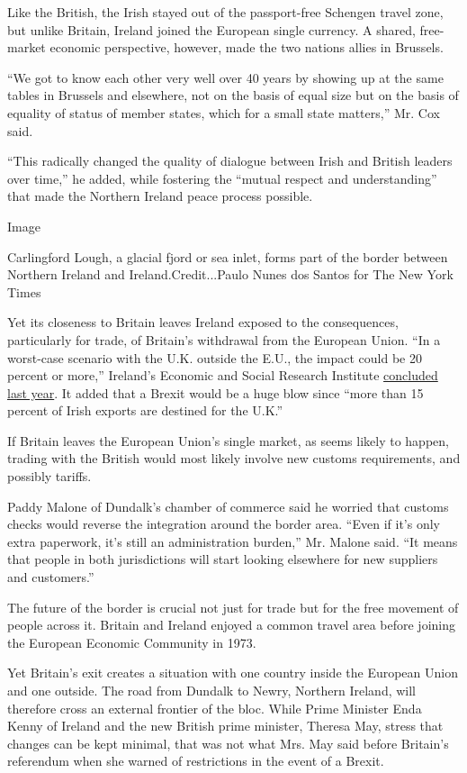 Like the British, the Irish stayed out of the passport-free Schengen
travel zone, but unlike Britain, Ireland joined the European single
currency. A shared, free-market economic perspective, however, made the
two nations allies in Brussels.

``We got to know each other very well over 40 years by showing up at the
same tables in Brussels and elsewhere, not on the basis of equal size
but on the basis of equality of status of member states, which for a
small state matters,'' Mr. Cox said.

``This radically changed the quality of dialogue between Irish and
British leaders over time,'' he added, while fostering the ``mutual
respect and understanding'' that made the Northern Ireland peace process
possible.

Image

Carlingford Lough, a glacial fjord or sea inlet, forms part of the
border between Northern Ireland and Ireland.Credit...Paulo Nunes dos
Santos for The New York Times

Yet its closeness to Britain leaves Ireland exposed to the consequences,
particularly for trade, of Britain's withdrawal from the European Union.
``In a worst-case scenario with the U.K. outside the E.U., the impact
could be 20 percent or more,'' Ireland's Economic and Social Research
Institute
\href{https://www.esri.ie/publications/scoping-the-possible-economic-implications-of-brexit-on-ireland-2/}{concluded
last year}. It added that a Brexit would be a huge blow since ``more
than 15 percent of Irish exports are destined for the U.K.''

If Britain leaves the European Union's single market, as seems likely to
happen, trading with the British would most likely involve new customs
requirements, and possibly tariffs.

Paddy Malone of Dundalk's chamber of commerce said he worried that
customs checks would reverse the integration around the border area.
``Even if it's only extra paperwork, it's still an administration
burden,'' Mr. Malone said. ``It means that people in both jurisdictions
will start looking elsewhere for new suppliers and customers.''

The future of the border is crucial not just for trade but for the free
movement of people across it. Britain and Ireland enjoyed a common
travel area before joining the European Economic Community in 1973.

Yet Britain's exit creates a situation with one country inside the
European Union and one outside. The road from Dundalk to Newry, Northern
Ireland, will therefore cross an external frontier of the bloc. While
Prime Minister Enda Kenny of Ireland and the new British prime minister,
Theresa May, stress that changes can be kept minimal, that was not what
Mrs. May said before Britain's referendum when she warned of
restrictions in the event of a Brexit.

